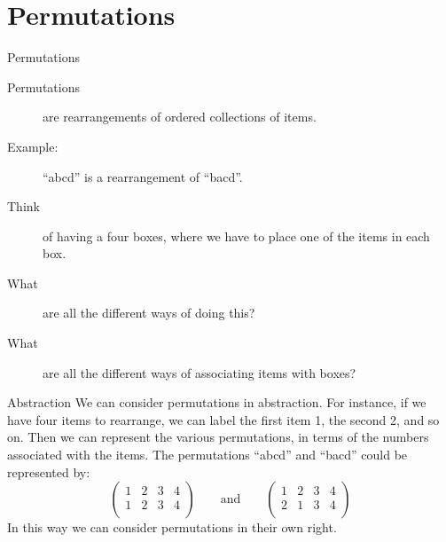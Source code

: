 %
%
%
%
%
%







\section{Permutations}


\begin{frame}{Permutations}
  \begin{description}
    \item[Permutations] are rearrangements of ordered collections of items.
    \item[Example:] ``abcd'' is a rearrangement of ``bacd''.
    \item[Think] of having a four boxes, where we have to place one of the items in each box.
    \item[What] are all the different ways of doing this?
    \item[What] are all the different ways of associating items with boxes?
  \end{description}
\end{frame}

\begin{frame}{Abstraction}
    We can consider permutations in abstraction.
    For instance, if we have four items to rearrange, we can label the first item 1, the second 2, and so on.
    Then we can represent the various permutations, in terms of the numbers associated with the items.
    The permutations ``abcd'' and ``bacd'' could be represented by:
      \[ \left( \begin{array}{cccc} 1 & 2 & 3 & 4 \\ 1 & 2 & 3 & 4 \\ \end{array} \right) 
          \qquad \textrm{and} \qquad
         \left( \begin{array}{cccc} 1 & 2 & 3 & 4 \\ 2 & 1 & 3 & 4 \\ \end{array} \right) \]
    In this way we can consider permutations in their own right.
\end{frame}



